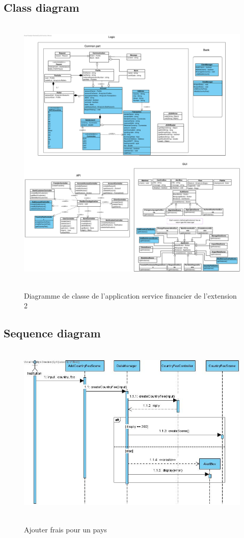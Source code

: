 \documentclass[]{report}
\begin{document}
\newpage

\subsection{Class diagram}

\begin{figure}[h!]
	\hbox{
		\centering\includegraphics[width=\linewidth]{img/Class Diagram Institution - Extension 2.pdf}
	}
	\caption{Diagramme de classe de l'application service financier de l'extension 2}
\end{figure}

\newpage

\subsection{Sequence diagram}

\begin{figure}[h!]
	\hbox{
		\centering\includegraphics[width=\linewidth]{img/Sequence 4 - Extension 2.jpg}
	}
	\caption{Ajouter frais pour un pays}
	\end{figure}
\end{document}
